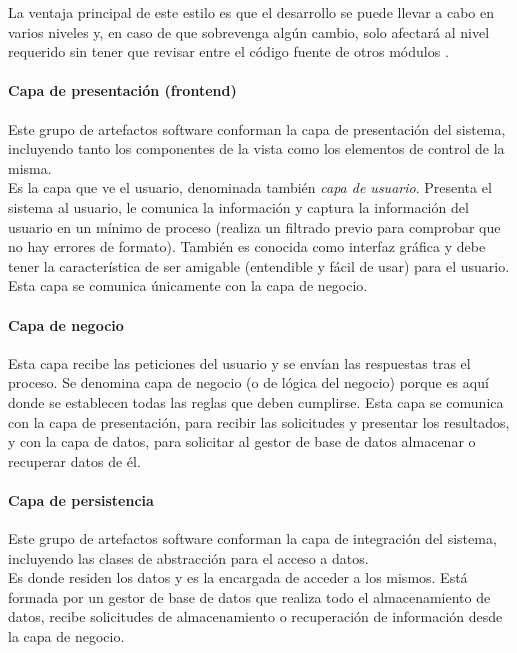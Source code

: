 La ventaja principal de este estilo es que el desarrollo se puede llevar a cabo en varios niveles y, en caso de que sobrevenga algún cambio, solo afectará al nivel requerido sin tener que revisar entre el código fuente de otros módulos \cite{ProgPorCapas}.

\paragraph*{Capa de presentación (frontend)}

Este grupo de artefactos software conforman la capa de presentación del sistema, incluyendo tanto los componentes de la vista como los elementos de control de la misma. \\

Es la capa que ve el usuario, denominada también \textit{capa de usuario}. Presenta el sistema al usuario, le comunica la información y captura la información del usuario en un mínimo de proceso (realiza un filtrado previo para comprobar que no hay errores de formato). También es conocida como interfaz gráfica y debe tener la característica de ser amigable (entendible y fácil de usar) para el usuario. Esta capa se comunica únicamente con la capa de negocio.

\paragraph*{Capa de negocio}

Esta capa recibe las peticiones del usuario y se envían las respuestas tras el proceso. Se denomina capa de negocio (o de lógica del negocio) porque es aquí donde se establecen todas las reglas que deben cumplirse. Esta capa se comunica con la capa de presentación, para recibir las solicitudes y presentar los resultados, y con la capa de datos, para solicitar al gestor de base de datos almacenar o recuperar datos de él. 

\paragraph*{Capa de persistencia}

Este grupo de artefactos software conforman la capa de integración del sistema, incluyendo las clases de abstracción para el acceso a datos.\\

Es donde residen los datos y es la encargada de acceder a los mismos. Está formada por un gestor de base de datos que realiza todo el almacenamiento de datos, recibe solicitudes de almacenamiento o recuperación de información desde la capa de negocio.\\

